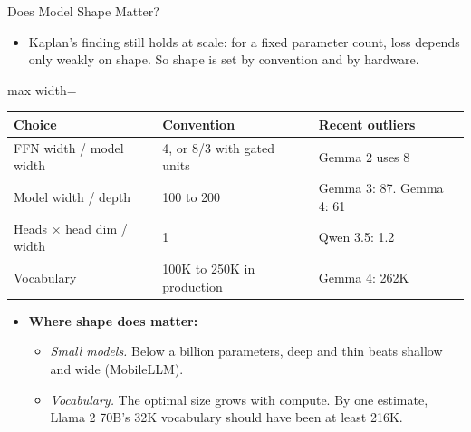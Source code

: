 \begin{frame}{Does Model Shape Matter?}
    \begin{itemize}\itemsep0.4em
        \item Kaplan's finding still holds at scale: for a fixed parameter count, loss depends only weakly on shape. So shape is set by convention and by hardware.
    \end{itemize}
    \begin{center}
    \small
    \begin{adjustbox}{max width=\linewidth}\begin{tabular}{lll}
        \toprule
        \textbf{Choice} & \textbf{Convention} & \textbf{Recent outliers} \\
        \midrule
        FFN width / model width & 4, or 8/3 with gated units & Gemma 2 uses 8 \\
        Model width / depth & 100 to 200 & Gemma 3: 87. Gemma 4: 61 \\
        Heads $\times$ head dim / width & 1 & Qwen 3.5: 1.2 \\
        Vocabulary & 100K to 250K in production & Gemma 4: 262K \\
        \bottomrule
    \end{tabular}\end{adjustbox}
    \end{center}
    \begin{itemize}\itemsep0.4em
        \item \textbf{Where shape does matter:}
        \begin{itemize}\itemsep0.2em
            \item \emph{Small models.} Below a billion parameters, deep and thin beats shallow and wide (MobileLLM).
            \item \emph{Vocabulary.} The optimal size grows with compute. By one estimate, Llama 2 70B's 32K vocabulary should have been at least 216K.
        \end{itemize}
    \end{itemize}
\end{frame}

